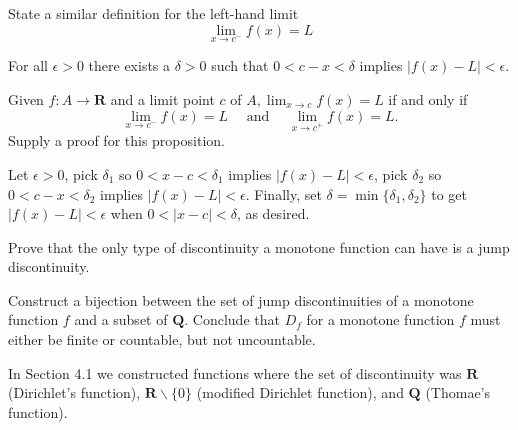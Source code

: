 \begin{exercise}
  State a similar definition for the left-hand limit
  $$
  \lim _{x \rightarrow c^{-}} f(x)=L
  $$
\end{exercise}
\begin{solution}
  For all $\epsilon > 0$ there exists a $\delta > 0$ such that $0 < c-x < \delta$ implies $|f(x)-L|<\epsilon$.
\end{solution}

\begin{exercise}
  Given $f: A \rightarrow \mathbf{R}$ and a limit point $c$ of $A, \lim _{x \rightarrow c} f(x)=L$ if and only if
  $$
  \lim _{x \rightarrow c^{-}} f(x)=L \quad \text { and } \quad \lim _{x \rightarrow c^{+}} f(x)=L .
  $$
  Supply a proof for this proposition.
\end{exercise}
\begin{solution}
  Let $\epsilon > 0$, pick $\delta_1$ so $0 < x-c < \delta_1$ implies $|f(x)-L|<\epsilon$, pick $\delta_2$ so $0 < c-x < \delta_2$ implies $|f(x)-L|<\epsilon$. Finally, set $\delta = \min\{\delta_1, \delta_2\}$ to get $|f(x)-L|<\epsilon$ when $0 < |x-c| < \delta$, as desired.
\end{solution}

\begin{exercise}
  Prove that the only type of discontinuity a monotone function can have is a jump discontinuity.
\end{exercise}
\begin{solution}
  \TODO
\end{solution}

\begin{exercise}
  Construct a bijection between the set of jump discontinuities of a monotone function $f$ and a subset of $\mathbf{Q}$. Conclude that $D_{f}$ for a monotone function $f$ must either be finite or countable, but not uncountable.
\end{exercise}
\begin{solution}
  \TODO
\end{solution}

\begin{exercise}
  In Section 4.1 we constructed functions where the set of discontinuity was $\mathbf{R}$ (Dirichlet's function), $\mathbf{R} \backslash\{0\}$ (modified Dirichlet function), and $\mathbf{Q}$ (Thomae's function).

\end{exercise}
\begin{solution}
  \TODO
\end{solution}

